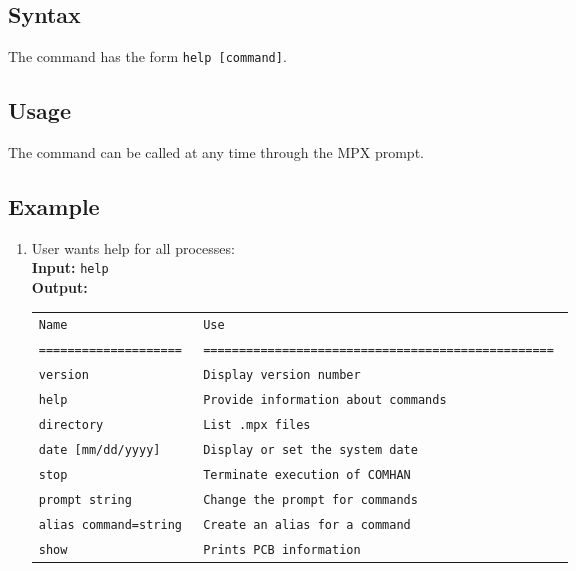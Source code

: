 \subsection{Syntax}

The command has the form {\tt help [command]}.

\subsection{Usage}

The command can be called at any time through the MPX prompt.

\subsection{Example}
\begin{enumerate}
    \item User wants help for all processes: \\
        {\bf Input:} {\tt help} \\
        {\bf Output:} \\
        \begin{tabular}{ll}
            {\tt Name                 } & \tt{Use                                              } \\
            {\tt ==================== } & \tt{=================================================} \\
            {\tt version              } & \tt{Display version number                           } \\
            {\tt help                 } & \tt{Provide information about commands               } \\
            {\tt directory            } & \tt{List .mpx files                                  } \\
            {\tt date [mm/dd/yyyy]    } & \tt{Display or set the system date                   } \\
            {\tt stop                 } & \tt{Terminate execution of COMHAN                    } \\
            {\tt prompt string        } & \tt{Change the prompt for commands                   } \\
            {\tt alias command=string } & \tt{Create an alias for a command                    } \\
            {\tt show                 } & \tt{Prints PCB information                           } \\

\end{tabular}
\end{enumerate}
